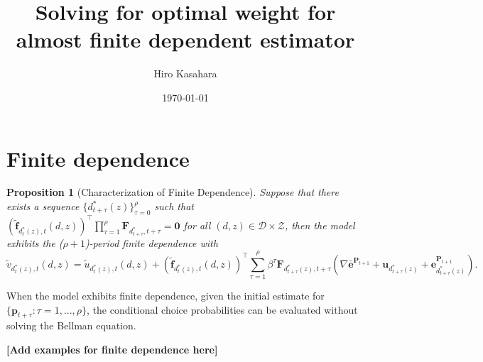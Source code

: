 \documentclass{article}
\title{Solving for optimal weight for almost finite dependent estimator}
\author{Hiro Kasahara}
\date{\today}
\def\bs{\boldsymbol}
\def\tbf{\textbf}
\def\t{^{\top}}
\newtheorem{proposition}{Proposition}
\begin{document}
\maketitle

 \section{Finite dependence}

 \begin{proposition}[Characterization of Finite Dependence]
Suppose that there exists a sequence $\{d_{t+\tau}^*(z)\}_{\tau=0}^{\rho}$ such that  $   (\tilde{\bs{f}}_{d_t^*(z),t}(d,z))\t \prod_{\tau=1}^\rho  \bs{F}_{d_{t+\tau}^*,t+\tau} =\bs{0}$ for all $(d,z)\in\mathcal{D}\times \mathcal{Z}$, then   the model exhibits the  ($\rho+1$)-period finite dependence with
 \[
 \tilde{ {v}}_{d_t^*(z),t}(d,z) = \tilde u_{d_t^*(z),t}(d,z) +     (\tilde{\bs{f}}_{d_t^*(z),t}(d,z))\t\sum_{\tau=1}^\rho \beta^{\tau} {\bs{F}} _{d_{t+\tau}^*(z),t+\tau}  \left( \nabla \bar{\bs{e}}^{\bs{P}_{t+1}} + \bs{u}_{d_{t+\tau}^*(z)}  + \bs{e}_{d_{t+\tau}^*(z)} ^{\bs{P}_{t+1}} \right).
 \]
 \end{proposition}
 \cite{Arcidiacono2016}

When the model exhibits finite dependence, given  the initial estimate for $\{\bs{p}_{t+\tau}:\tau=1,...,\rho\}$, the conditional choice probabilities can be evaluated without solving the Bellman equation.

 \tbf{[Add examples for finite dependence here]}
\end{document}
